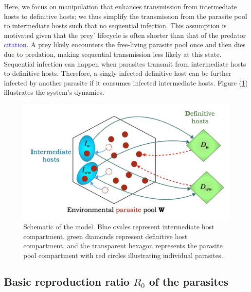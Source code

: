\documentclass[a4paper]{scrartcl}
\newcommand{\cha}[1]{\textcolor{blue}{#1}}
\begin{document}
Here, we focus on manipulation that enhances transmission from intermediate hosts to definitive hosts; we thus simplify the transmission from the parasite pool to intermediate hosts such that no sequential infection. 
This assumption is motivated given that the prey' lifecycle is often shorter than that of the predator \cha{citation}. 
A prey likely encounters the free-living parasite pool once and then dies due to predation, making sequential transmission less likely at this state.
Sequential infection can happen when parasites transmit from intermediate hosts to definitive hosts. 
Therefore, a singly infected definitive host can be further infected by another parasite if it consumes infected intermediate hosts. 
Figure (\ref{fig:schematic}) illustrates the system's dynamics.
%
\begin{figure}[ht!]
\centering
\includegraphics[width=\textwidth]{Figures/schematic.jpeg}
\caption{Schematic of the model. Blue ovales represent intermediate host compartment, 
green diamonds represent definitive host compartment, 
and the transparent hexagon represents the parasite pool compartment with red circles illustrating individual parasites.
}
\label{fig:schematic}
\end{figure}

\subsection*{Basic reproduction ratio $R_0$ of the parasites}
\end{document}

